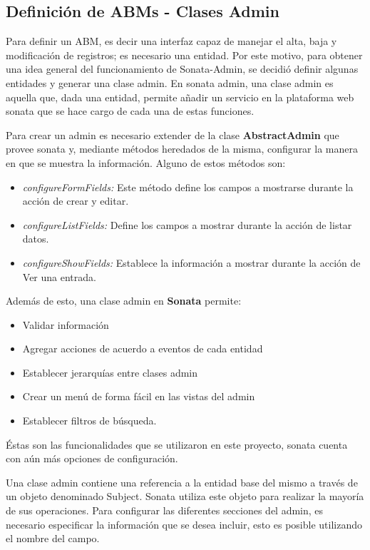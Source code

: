 
\subsection{Definición de ABMs - Clases Admin}%
\label{sub:definición_de_abms_clases_admin}

Para definir un ABM, es decir una interfaz capaz de manejar el alta, baja y modificación de registros; es necesario una entidad. Por este motivo, para obtener
una idea general del funcionamiento de Sonata-Admin, se decidió definir algunas entidades y generar una clase admin\@.
En sonata admin, una clase admin es aquella que, dada una entidad, permite añadir un servicio en la plataforma web sonata que se hace cargo de cada una de estas funciones.

Para crear un admin es necesario extender de la clase \textbf{AbstractAdmin} que provee sonata y, mediante métodos heredados de la misma, configurar la manera en
que se muestra la información\@.
Alguno de estos métodos son:

\begin{itemize}
    \item \textit{configureFormFields:} Este método define los campos a mostrarse durante la acción de crear y editar.
    \item \textit{configureListFields:} Define los campos a mostrar durante la acción de listar datos.
    \item \textit{configureShowFields:} Establece la información a mostrar durante la acción de Ver una entrada.
\end{itemize}

\noindent
Además de esto, una clase admin en \textbf{Sonata} permite:
\begin{itemize}
    \item Validar información
    \item Agregar acciones de acuerdo a eventos de cada entidad
    \item Establecer jerarquías entre clases admin
    \item Crear un menú de forma fácil en las vistas del admin
    \item Establecer filtros de búsqueda.
\end{itemize}

Éstas son las funcionalidades que se utilizaron en este proyecto, sonata cuenta con aún más opciones de configuración.

Una clase admin contiene una referencia a la entidad base del mismo a través de un objeto denominado Subject. Sonata utiliza este objeto para realizar
la mayoría de sus operaciones.
Para configurar las diferentes secciones del admin, es necesario especificar la información que se desea incluir, esto es posible utilizando el nombre del campo.

